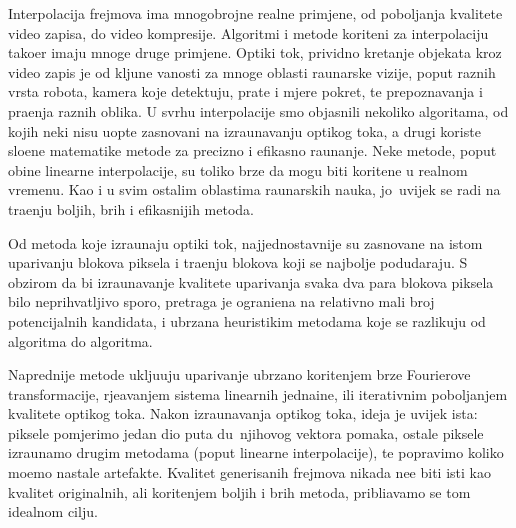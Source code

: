 Interpolacija frejmova ima mnogobrojne realne primjene, od pobolj\sh anja kvalitete video zapisa, do video kompresije. Algoritmi i metode kori\sh teni za interpolaciju
tako\dj er imaju mnoge druge primjene. Opti\ch ki tok, prividno kretanje objekata kroz video zapis je od klju\ch ne va\zh nosti za mnoge oblasti ra\ch unarske vizije, poput
raznih vrsta robota, kamera koje detektuju, prate i mjere pokret, te prepoznavanja i pra\cj enja raznih oblika. U svrhu interpolacije smo objasnili nekoliko algoritama, od kojih
neki nisu uop\sh te zasnovani na izra\ch unavanju opti\ch kog toka, a drugi koriste slo\zh ene matemati\ch ke metode za precizno i efikasno ra\ch unanje. Neke metode,
poput obi\ch ne linearne interpolacije, su toliko brze da mogu biti kori\sh tene u realnom vremenu. Kao i u svim ostalim oblastima ra\ch unarskih nauka, jo\sh\ uvijek se radi
na tra\zh enju boljih, br\zh ih i efikasnijih metoda.

Od metoda koje izra\ch unaju opti\ch ki tok, najjednostavnije su zasnovane na \ch istom uparivanju blokova piksela i tra\zh enju blokova koji se najbolje podudaraju.
S obzirom da bi izra\ch unavanje kvalitete uparivanja svaka dva para blokova piksela bilo neprihvatljivo sporo, pretraga je ograni\ch ena na relativno mali broj potencijalnih
kandidata, i ubrzana heuristi\ch kim metodama koje se razlikuju od algoritma do algoritma.

Naprednije metode uklju\ch uju uparivanje ubrzano kori\sh tenjem brze Fourierove transformacije, rje\sh avanjem sistema linearnih jedna\ch ine, ili iterativnim pobolj\sh anjem
kvalitete opti\ch kog toka. Nakon izra\ch unavanja opti\ch kog toka, ideja je uvijek ista: piksele pomjerimo jedan dio puta du\zh\ njihovog vektora pomaka, ostale piksele izra\ch unamo
drugim metodama (poput linearne interpolacije), te popravimo koliko mo\zh emo nastale artefakte. Kvalitet generisanih frejmova nikada ne\cj e biti isti kao kvalitet originalnih,
ali kori\sh tenjem boljih i br\zh ih metoda, pribli\zh avamo se tom idealnom cilju.